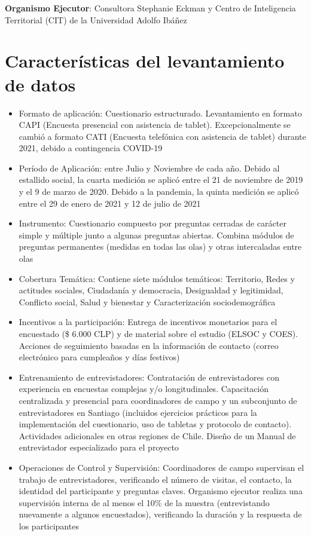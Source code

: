\documentclass[
  12pt,
]{book}
\begin{document}
\textbf{Organismo Ejecutor}: Consultora Stephanie Eckman y Centro de Inteligencia Territorial (CIT) de la Universidad Adolfo Ibáñez

\hypertarget{caracteruxedsticas-del-levantamiento-de-datos}{%
\section{Características del levantamiento de datos}\label{caracteruxedsticas-del-levantamiento-de-datos}}

\begin{itemize}
\item
  Formato de aplicación: Cuestionario estructurado. Levantamiento en formato CAPI (Encuesta presencial con asistencia de tablet). Excepcionalmente se cambió a formato CATI (Encuesta telefónica con asistencia de tablet) durante 2021, debido a contingencia COVID-19
\item
  Período de Aplicación: entre Julio y Noviembre de cada año. Debido al estallido social, la cuarta medición se aplicó entre el 21 de noviembre de 2019 y el 9 de marzo de 2020. Debido a la pandemia, la quinta medición se aplicó entre el 29 de enero de 2021 y 12 de julio de 2021
\item
  Instrumento: Cuestionario compuesto por preguntas cerradas de carácter simple y múltiple junto a algunas preguntas abiertas. Combina módulos de preguntas permanentes (medidas en todas las olas) y otras intercaladas entre olas
\item
  Cobertura Temática: Contiene siete módulos temáticos: Territorio, Redes y actitudes sociales, Ciudadanía y democracia, Desigualdad y legitimidad, Conflicto social, Salud y bienestar y Caracterización sociodemográfica
\item
  Incentivos a la participación: Entrega de incentivos monetarios para el encuestado (\$ 6.000 CLP) y de material sobre el estudio (ELSOC y COES). Acciones de seguimiento basadas en la información de contacto (correo electrónico para cumpleaños y días festivos)
\item
  Entrenamiento de entrevistadores: Contratación de entrevistadores con experiencia en encuestas complejas y/o longitudinales. Capacitación centralizada y presencial para coordinadores de campo y un subconjunto de entrevistadores en Santiago (incluidos ejercicios prácticos para la implementación del cuestionario, uso de tabletas y protocolo de contacto). Actividades adicionales en otras regiones de Chile. Diseño de un Manual de entrevistador especializado para el proyecto
\item
  Operaciones de Control y Supervisión: Coordinadores de campo supervisan el trabajo de entrevistadores, verificando el número de visitas, el contacto, la identidad del participante y preguntas claves. Organismo ejecutor realiza una supervisión interna de al menos el 10\% de la muestra (entrevistando nuevamente a algunos encuestados), verificando la duración y la respuesta de los participantes
\end{itemize}
\end{document}
